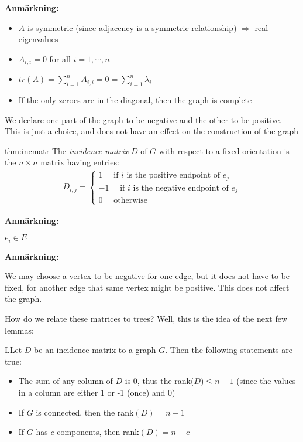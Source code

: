 \par\bigskip
\noindent\textbf{Anmärkning:}\par
\begin{itemize}
  \item $A$ is symmetric (since adjacency is a symmetric relationship) $\Rightarrow$ real eigenvalues
  \item $A_{i,i} = 0$ for all $i=1,\cdots,n$
  \item $tr(A) = \sum_{i=1}^{n}A_{i,i} = 0 = \sum_{i=1}^{n}\lambda_i$
  \item If the only zeroes are in the diagonal, then the graph is complete
\end{itemize}
\par\bigskip
\noindent We declare one part of the graph to be negative and the other to be positive. This is just a choice, and does not have an effect on the construction of the graph
\par\bigskip
\begin{theo}{thm:incmatr}
  The \textit{incidence matrix} $D$ of $G$ with respect to a fixed orientation is the $n\times n$ matrix having entries:
  \begin{equation*}
    \begin{gathered}
      D_{i,j} = \begin{cases}1\quad \text{ if $i$ is the positive endpoint of $e_j$}\\-1\quad\text{ if $i$ is the negative endpoint of $e_j$}\\0\quad \text{ otherwise}\end{cases}
    \end{gathered}
  \end{equation*}
  \par\bigskip
  \noindent\textbf{Anmärkning:}\par
  \noindent $e_i\in E$
  \par\bigskip
  \noindent\textbf{Anmärkning:}\par
  \noindent We may choose a vertex to be negative for one edge, but it does not have to be fixed, for another edge that same vertex might be positive. This does not affect the graph. 
\end{theo}
\newpage
\noindent How do we relate these matrices to trees? Well, this is the idea of the next few lemmas:
\par\bigskip
\begin{lem}
  LLet $D$ be an incidence matrix to a graph $G$. Then the following statements are true:\par
  \begin{itemize}
    \item The sum of any column of $D$ is 0, thus the rank($D$)$\leq n-1$ (since the values in a column are either 1 or -1 (once) and 0)\par
    \item If $G$ is connected, then the rank$(D) = n-1$
    \item If $G$ has $c$ components, then rank$(D) = n-c$
  \end{itemize}
\end{lem}
